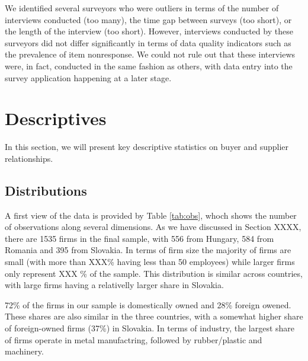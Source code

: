 \documentclass[final, dvipsnames, authoryear,12pt]{elsarticle}
\begin{document}
We identified several surveyors who were outliers in terms of the number of interviews conducted (too many), the time gap between surveys (too short), or the length of the interview (too short). However, interviews conducted by these surveyors did not differ significantly in terms of data quality indicators such as the prevalence of item nonresponse. We could not rule out that these interviews were, in fact, conducted in the same fashion as others, with data entry into the survey application happening at a later stage.


\section{Descriptives}

In this section, we will present key descriptive statistics on buyer and supplier relationships. 



\subsection{Distributions}


A first view of the data is provided by Table \ref{tab:obs}, whoch shows the number of observations along several dimensions. As we have discussed in Section XXXX, there are 1535 firms in the final sample, with 556 from Hungary, 584 from Romania and 395 from Slovakia.  In terms of firm size the majority of firms are small (with more than XXX\% having less than 50 employees) while larger firms only represent XXX \% of the sample. This distribution is similar across countries, with large firms having a relativelly larger share in Slovakia.


72\% of the firms in our sample is domestically owned and 28\% foreign owened. These shares are also similar in the three countries, with a somewhat higher share of foreign-owned firms (37\%) in Slovakia. In terms of industry, the largest share of firms operate in metal manufactring, followed by rubber/plastic and machinery.

\end{document}
